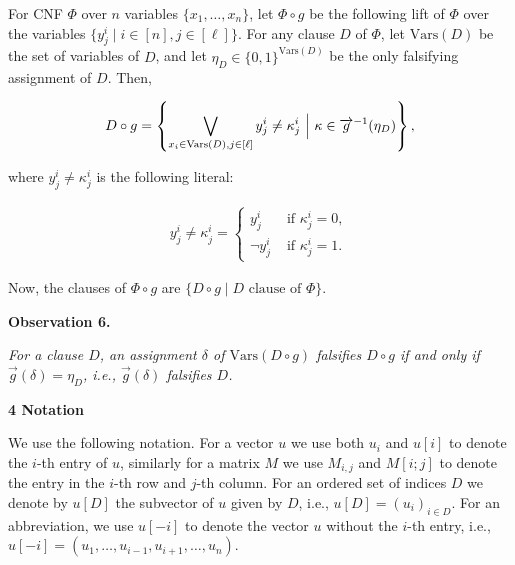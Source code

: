 For CNF $\Phi$ over $n$ variables $\{x_{1},\dots,x_{n}\}$, let $\Phi\circ g$ be the following lift of $\Phi$ over the variables $\{y^{i}_{j}\mid i\in[n],j\in[\ell]\}$.
For any clause $D$ of $\Phi$, let $\text{Vars}(D)$ be the set of variables of $D$, and let $\eta_{D}\in\{0,1\}^{\text{Vars}(D)}$ be the only falsifying assignment of $D$.
Then,\par


\[\begin{gathered}
D\circ g=\left\{\bigvee_{x_{i}\in\text{Vars}(D),j\in[\ell]}y^{i}_{j}\neq\kappa%
^{i}_{j}\nobreak\ \Bigl{|}\nobreak\ \kappa\in%
\overrightarrow{g}^{-1}(\eta_{D})\right\},
\end{gathered}\]


where $y^{i}_{j}\neq\kappa^{i}_{j}$ is the following literal:\par


\[\begin{gathered}
y^{i}_{j}\neq\kappa^{i}_{j}=\begin{cases}y^{i}_{j}&\text{ if }\kappa^{i}_{j}=0%
,\\
\neg y^{i}_{j}&\text{ if }\kappa^{i}_{j}=1.\end{cases}
\end{gathered}\]


Now, the clauses of $\Phi\circ g$ are $\{D\circ g\mid D\text{ clause of }\Phi\}$.\par





\par\medskip\noindent\textbf{
\textbf{Observation 6}\textbf{.}
}\par



\emph{For a clause $D$, an assignment $\delta$ of $\text{Vars}(D\circ g)$ falsifies $D\circ g$ if and only if $\overrightarrow{g}(\delta)=\eta_{D}$, i.e., $\overrightarrow{g}(\delta)$ falsifies $D$.}\par







\par\medskip\noindent\textbf{
4 Notation}\par




We use the following notation.
For a vector $u$ we use both $u_{i}$ and $u[i]$ to denote the $i$-th entry of $u$, similarly for a matrix $M$ we use $M_{i,j}$ and $M[i;j]$ to denote the entry in the $i$-th row and $j$-th column.
For an ordered set of indices $D$ we denote by $u[D]$ the subvector of $u$ given by $D$, i.e., $u[D]=(u_{i})_{i\in D}$.
For an abbreviation, we use $u[-i]$ to denote the vector $u$ without the $i$-th entry, i.e., $u[-i]=(u_{1},\dots,u_{i-1},u_{i+1},\dots,u_{n})$.\par





